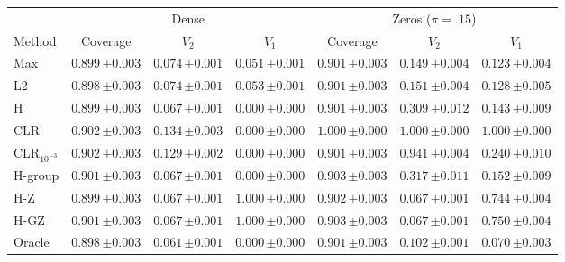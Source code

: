 \begin{tabular}{lcccccc}\toprule
 & \multicolumn{3}{c}{Dense} & \multicolumn{3}{c}{Zeros ($\pi=.15$)} \\
Method & Coverage & $V_2$ & $V_1$ & Coverage & $V_2$ & $V_1$ \\\midrule
Max & $0.899\,{\scriptstyle\pm 0.003}$ & $0.074\,{\scriptstyle\pm 0.001}$ & $0.051\,{\scriptstyle\pm 0.001}$ & $0.901\,{\scriptstyle\pm 0.003}$ & $0.149\,{\scriptstyle\pm 0.004}$ & $0.123\,{\scriptstyle\pm 0.004}$ \\
L2 & $0.898\,{\scriptstyle\pm 0.003}$ & $0.074\,{\scriptstyle\pm 0.001}$ & $0.053\,{\scriptstyle\pm 0.001}$ & $0.901\,{\scriptstyle\pm 0.003}$ & $0.151\,{\scriptstyle\pm 0.004}$ & $0.128\,{\scriptstyle\pm 0.005}$ \\
H & $0.899\,{\scriptstyle\pm 0.003}$ & $0.067\,{\scriptstyle\pm 0.001}$ & $0.000\,{\scriptstyle\pm 0.000}$ & $0.901\,{\scriptstyle\pm 0.003}$ & $0.309\,{\scriptstyle\pm 0.012}$ & $0.143\,{\scriptstyle\pm 0.009}$ \\
CLR & $0.902\,{\scriptstyle\pm 0.003}$ & $0.134\,{\scriptstyle\pm 0.003}$ & $0.000\,{\scriptstyle\pm 0.000}$ & $1.000\,{\scriptstyle\pm 0.000}$ & $1.000\,{\scriptstyle\pm 0.000}$ & $1.000\,{\scriptstyle\pm 0.000}$ \\
CLR$_{10^{-3}}$ & $0.902\,{\scriptstyle\pm 0.003}$ & $0.129\,{\scriptstyle\pm 0.002}$ & $0.000\,{\scriptstyle\pm 0.000}$ & $0.901\,{\scriptstyle\pm 0.003}$ & $0.941\,{\scriptstyle\pm 0.004}$ & $0.240\,{\scriptstyle\pm 0.010}$ \\
H-group & $0.901\,{\scriptstyle\pm 0.003}$ & $0.067\,{\scriptstyle\pm 0.001}$ & $0.000\,{\scriptstyle\pm 0.000}$ & $0.903\,{\scriptstyle\pm 0.003}$ & $0.317\,{\scriptstyle\pm 0.011}$ & $0.152\,{\scriptstyle\pm 0.009}$ \\
H-Z & $0.899\,{\scriptstyle\pm 0.003}$ & $0.067\,{\scriptstyle\pm 0.001}$ & $1.000\,{\scriptstyle\pm 0.000}$ & $0.902\,{\scriptstyle\pm 0.003}$ & $0.067\,{\scriptstyle\pm 0.001}$ & $0.744\,{\scriptstyle\pm 0.004}$ \\
H-GZ & $0.901\,{\scriptstyle\pm 0.003}$ & $0.067\,{\scriptstyle\pm 0.001}$ & $1.000\,{\scriptstyle\pm 0.000}$ & $0.903\,{\scriptstyle\pm 0.003}$ & $0.067\,{\scriptstyle\pm 0.001}$ & $0.750\,{\scriptstyle\pm 0.004}$ \\
Oracle & $0.898\,{\scriptstyle\pm 0.003}$ & $0.061\,{\scriptstyle\pm 0.001}$ & $0.000\,{\scriptstyle\pm 0.000}$ & $0.901\,{\scriptstyle\pm 0.003}$ & $0.102\,{\scriptstyle\pm 0.001}$ & $0.070\,{\scriptstyle\pm 0.003}$ \\
\bottomrule
\end{tabular}
